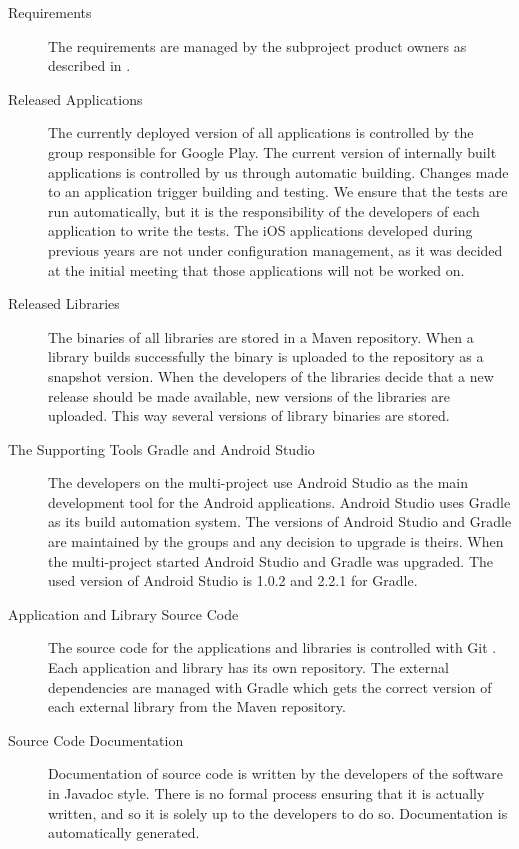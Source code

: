 \begin{description}
  \item[Requirements] The requirements are managed by the subproject product owners as described in .
  \item[Released Applications] The currently deployed version of all applications is controlled by the group responsible for Google Play. The current version of internally built applications is controlled by us through automatic building. Changes made to an application trigger building and testing. We ensure that the tests are run automatically, but it is the responsibility of the developers of each application to write the tests. The iOS applications developed during previous years are not under configuration management, as it was decided at the initial meeting that those applications will not be worked on.
  \item[Released Libraries] The binaries of all libraries are stored in a Maven repository. When a library builds successfully the binary is uploaded to the repository as a snapshot version. When the developers of the libraries decide that a new release should be made available, new versions of the libraries are uploaded. This way several versions of library binaries are stored.
  \item[The Supporting Tools Gradle and Android Studio] The developers on the multi-project use Android Studio as the main development tool for the Android applications. Android Studio uses Gradle as its build automation system. The versions of Android Studio and Gradle are maintained by the \bd groups and any decision to upgrade is theirs. When the multi-project started Android Studio and Gradle was upgraded. The used version of Android Studio is 1.0.2 and 2.2.1 for Gradle.
  \item[Application and Library Source Code] The source code for the applications and libraries is controlled with Git \parencite{gitwebsite}. Each application and library has its own repository. The external dependencies are managed with Gradle which gets the correct version of each external library from the Maven repository.
  \item[Source Code Documentation] Documentation of source code is written by the developers of the software in Javadoc style. There is no formal process ensuring that it is actually written, and so it is solely up to the developers to do so. Documentation is automatically generated.
\end{description}

